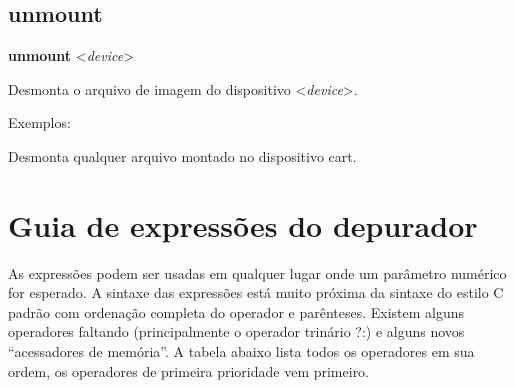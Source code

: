 \documentclass[letterpaper,10pt,brazil]{sphinxmanual}
\begin{document}
\subsection{unmount}
\label{debugger/image:unmount}\label{debugger/image:debugger-command-unmount}
\begin{DUlineblock}{0em}
\item[]
\begin{DUlineblock}{\DUlineblockindent}
\item[] \textbf{unmount} \textless{}\emph{device}\textgreater{}
\item[] 
\end{DUlineblock}
\item[] Desmonta o arquivo de imagem do dispositivo \textless{}\emph{device}\textgreater{}.
\item[] 
\item[] Exemplos:
\item[] 
\item[]
\begin{DUlineblock}{\DUlineblockindent}
\item[] 
\item[] 
\end{DUlineblock}
\item[] Desmonta qualquer arquivo montado no dispositivo cart.
\end{DUlineblock}


\section{Guia de expressões do depurador}
\label{debugger/expressions:guia-de-expressoes-do-depurador}\label{debugger/expressions:debugger-expressions-list}\label{debugger/expressions::doc}
As expressões podem ser usadas em qualquer lugar onde um parâmetro
numérico for esperado. A sintaxe das expressões está muito próxima da
sintaxe do estilo C padrão com ordenação completa do operador e
parênteses.
Existem alguns operadores faltando (principalmente o operador trinário
?:) e alguns novos ``acessadores de memória''. A tabela abaixo lista todos
os operadores em sua ordem, os operadores de primeira prioridade vem
primeiro.
\end{document}

